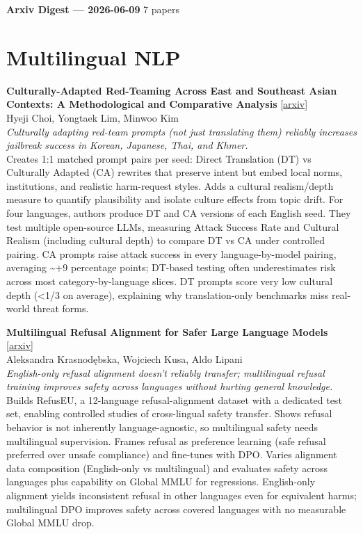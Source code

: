 \documentclass[12pt,letterpaper]{article}
\begin{document}
{\footnotesize\textbf{Arxiv Digest --- 2026-06-09} \hfill 7 papers}

\smallskip

\section*{Multilingual NLP}

{\small\textbf{Culturally-Adapted Red-Teaming Across East and Southeast Asian Contexts: A Methodological and Comparative Analysis}} {\scriptsize[\href{https://arxiv.org/abs/2606.09178}{arxiv}]}\\
{\scriptsize Hyeji Choi, Yongtaek Lim, Minwoo Kim}\\

{\small\textit{Culturally adapting red-team prompts (not just translating them) reliably increases jailbreak success in Korean, Japanese, Thai, and Khmer.}}\\[1pt]
{\footnotesize Creates 1:1 matched prompt pairs per seed: Direct Translation (DT) vs Culturally Adapted (CA) rewrites that preserve intent but embed local norms, institutions, and realistic harm-request styles. Adds a cultural realism/depth measure to quantify plausibility and isolate culture effects from topic drift. For four languages, authors produce DT and CA versions of each English seed. They test multiple open-source LLMs, measuring Attack Success Rate and Cultural Realism (including cultural depth) to compare DT vs CA under controlled pairing. CA prompts raise attack success in every language-by-model pairing, averaging \textasciitilde{}+9 percentage points; DT-based testing often underestimates risk across most category-by-language slices. DT prompts score very low cultural depth (<1/3 on average), explaining why translation-only benchmarks miss real-world threat forms.}

\medskip

{\small\textbf{Multilingual Refusal Alignment for Safer Large Language Models}} {\scriptsize[\href{https://arxiv.org/abs/2606.07535}{arxiv}]}\\
{\scriptsize Aleksandra Krasnod\k{e}bska, Wojciech Kusa, Aldo Lipani}\\

{\small\textit{English-only refusal alignment doesn't reliably transfer; multilingual refusal training improves safety across languages without hurting general knowledge.}}\\[1pt]
{\footnotesize Builds RefusEU, a 12-language refusal-alignment dataset with a dedicated test set, enabling controlled studies of cross-lingual safety transfer. Shows refusal behavior is not inherently language-agnostic, so multilingual safety needs multilingual supervision. Frames refusal as preference learning (safe refusal preferred over unsafe compliance) and fine-tunes with DPO. Varies alignment data composition (English-only vs multilingual) and evaluates safety across languages plus capability on Global MMLU for regressions. English-only alignment yields inconsistent refusal in other languages even for equivalent harms; multilingual DPO improves safety across covered languages with no measurable Global MMLU drop.}
\end{document}
